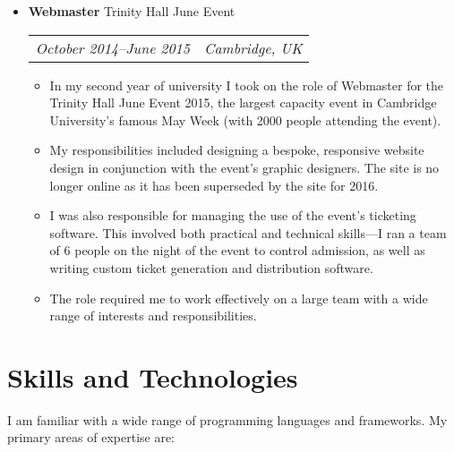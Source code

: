 \documentclass[letterpaper]{article}
\begin{document}
\begin{itemize}
    \item \textbf{Webmaster} Trinity Hall June Event \\
        \begin{tabular}{c|c}
            \emph{October 2014--June 2015} & \emph{Cambridge, UK}
        \end{tabular}
        \begin{itemize}
            \item In my second year of university I took on the role of
                Webmaster for the Trinity Hall June Event 2015, the largest
                capacity event in Cambridge University's famous May Week (with
                2000 people attending the event).
            \item My responsibilities included designing a bespoke, responsive
                website design in conjunction with the event's graphic
                designers. The site is no longer online as it has been
                superseded by the site for 2016.
            \item I was also responsible for managing the use of the event's
                ticketing software. This involved both practical and technical
                skills---I ran a team of 6 people on the night of the event to
                control admission, as well as writing custom ticket generation
                and distribution software.
            \item The role required me to work effectively on a large team with
                a wide range of interests and responsibilities.
        \end{itemize}

\end{itemize}

\clearpage

\section*{Skills and Technologies}

    I am familiar with a wide range of programming languages and frameworks. My
    primary areas of expertise are: \\
\end{document}
